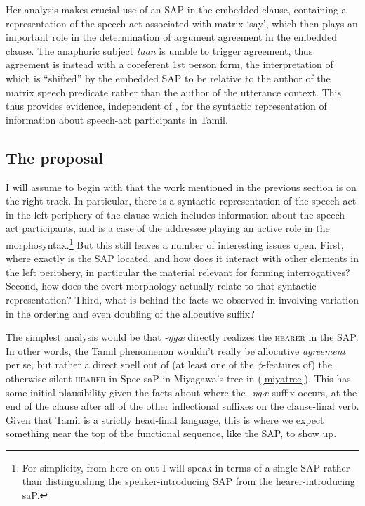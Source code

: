 \documentclass[output=paper, modfonts, nonflat]{langsci/langscibook}
\begin{document}
Her analysis makes crucial use of an SAP in the embedded clause,
containing a representation of the speech act associated with matrix
`say', which then plays an important role in the determination of
argument agreement in the embedded clause. The anaphoric subject
\textit{taan} is unable to trigger agreement, thus agreement is
instead with a coreferent 1st person form, the interpretation of which
is ``shifted'' by the embedded SAP to be relative to the author of the
matrix speech predicate rather than the author of the utterance
context. This thus provides evidence, independent of \allagr, for the
syntactic representation of information about speech-act participants
in Tamil.

\subsection{The proposal}
\label{sec:account}

I will assume to begin with that the work mentioned in the previous
section is on the right track. In particular, there is a syntactic
representation of the speech act in the left periphery of the clause
which includes information about the speech act participants, and
\allagr{} is a case of the addressee playing an active role in the
morphosyntax.\footnote{For simplicity, from here on out I will speak
  in terms of a single SAP rather than distinguishing the
  speaker-introducing SAP from the hearer-introducing saP.} But this
still leaves a number of interesting issues open. First, where exactly
is the SAP located, and how does it interact with other elements in
the left periphery, in particular the material relevant for forming
interrogatives? Second, how does the overt \allagr{} morphology
actually relate to that syntactic representation?  Third, what is
behind the facts we observed in  involving
variation in the ordering and even doubling of the allocutive suffix?

The simplest analysis would be that \textit{-ŋgæ} directly realizes
the \textsc{hearer} in the SAP.  In other words, the Tamil phenomenon
wouldn't really be allocutive \textit{agreement} per se, but rather a
direct spell out of (at least one of the $\phi$-features of) the
otherwise silent \textsc{hearer} in Spec-saP in Miyagawa's tree in
(\ref{miyatree}). This has some initial plausibility given the facts
about where the \textit{-ŋgæ} suffix occurs, at the end of the clause
after all of the other inflectional suffixes on the clause-final verb.
Given that Tamil is a strictly head-final language, this is where we
expect something near the top of the functional sequence, like the
SAP, to show up.
\end{document}
